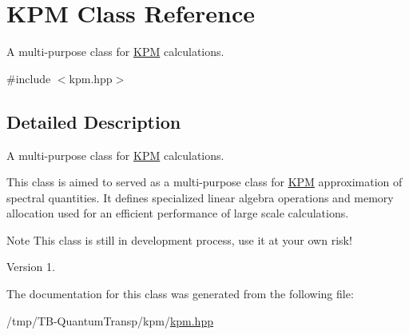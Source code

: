 \hypertarget{classKPM}{}\section{K\+PM Class Reference}
\label{classKPM}


A multi-\/purpose class for \hyperlink{classKPM}{K\+PM} calculations.  




{\ttfamily \#include $<$kpm.\+hpp$>$}



\subsection{Detailed Description}
A multi-\/purpose class for \hyperlink{classKPM}{K\+PM} calculations. 

This class is aimed to served as a multi-\/purpose class for \hyperlink{classKPM}{K\+PM} approximation of spectral quantities. It defines specialized linear algebra operations and memory allocation used for an efficient performance of large scale calculations.

\begin{DoxyNote}{Note}
This class is still in development process, use it at your own risk!
\end{DoxyNote}
\begin{DoxyVersion}{Version}
1. 
\end{DoxyVersion}


The documentation for this class was generated from the following file\+:\begin{DoxyCompactItemize}
\item 
/tmp/\+T\+B-\/\+Quantum\+Transp/kpm/\hyperlink{kpm_2kpm_8hpp}{kpm.\+hpp}\end{DoxyCompactItemize}
